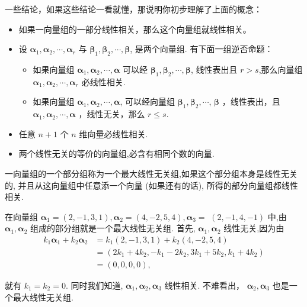 一些结论，如果这些结论一看就懂，那说明你初步理解了上面的概念：

\begin{itemize}
    \item 如果一向量组的一部分线性相关，那么这个向量组就线性相关。
    \item 设 $\boldsymbol{\alpha}_1, \boldsymbol{\alpha}_2, \cdots, \boldsymbol{\alpha}_r$ 与 $\boldsymbol{\beta}_1, \boldsymbol{\beta}_2, \cdots, \boldsymbol{\beta}$, 是两个向量组. 有下面一组逆否命题：
    \begin{itemize}
        \item  如果向量组 $\boldsymbol{\alpha}_1, \boldsymbol{\alpha}_2, \cdots, \boldsymbol{\alpha}$ 可以经 $\boldsymbol{\beta}_1, \boldsymbol{\beta}_2, \cdots, \boldsymbol{\beta}$, 线性表出且 $r>s$,那么向量组 $\boldsymbol{\alpha}_1, \boldsymbol{\alpha}_2, \cdots, \boldsymbol{\alpha}_r$ 必线性相关.

        \item 如果向量组 $\boldsymbol{\alpha}_1, \boldsymbol{\alpha}_2, \cdots, \boldsymbol{\alpha}$, 可以经向量组 $\boldsymbol{\beta}_1, \boldsymbol{\beta}_2, \cdots$, $\boldsymbol{\beta}$ ，线性表出，且 $\boldsymbol{\alpha}_1, \boldsymbol{\alpha}_2, \cdots, \boldsymbol{\alpha}$ ，线性无关，那么 $r \leqslant s$.
    \end{itemize}
    \item 任意 $n+1$ 个 $n$ 维向量必线性相关.
    \item 两个线性无关的等价的向量组,必含有相同个数的向量.
\end{itemize}

\begin{definition}[最大线性无关组]
    一向量组的一个部分组称为一个最大线性无关组,如果这个部分组本身是线性无关的, 并且从这向量组中任意添一个向量 (如果还有的话), 所得的部分向量组都线性相关.
\end{definition}

\begin{exercise}
    在向量组 $\boldsymbol{\alpha}_1=(2,-1,3,1), \boldsymbol{\alpha}_2=(4,-2,5,4), \boldsymbol{\alpha}_3=$ $(2,-1,4,-1)$ 中,由 $\boldsymbol{\alpha}_1, \boldsymbol{\alpha}_2$ 组成的部分组就是一个最大线性无关组. 首先, $\boldsymbol{\alpha}_1, \boldsymbol{\alpha}_2$ 线性无关,因为由
$$
\begin{aligned}
k_1 \boldsymbol{\alpha}_1+k_2 \boldsymbol{\alpha}_2 & =k_1(2,-1,3,1)+k_2(4,-2,5,4) \\
& =\left(2 k_1+4 k_2,-k_1-2 k_2, 3 k_1+5 k_2, k_1+4 k_2\right) \\
& =(0,0,0,0),
\end{aligned}
$$

就有 $k_1=k_2=0$. 同时我们知道, $\boldsymbol{\alpha}_1, \boldsymbol{\alpha}_2, \boldsymbol{\alpha}_3$ 线性相关. 不难看出， $\boldsymbol{\alpha}_2, \boldsymbol{\alpha}_3$ 也是一个最大线性无关组.
\end{exercise}

